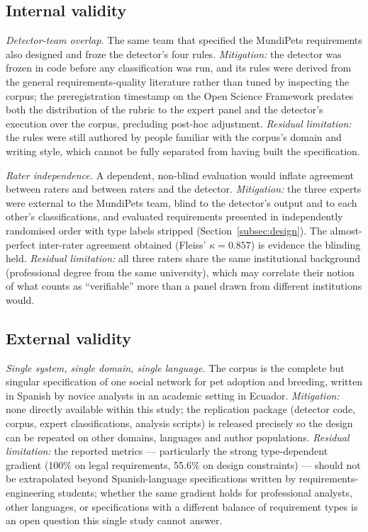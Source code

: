 \documentclass[pdflatex,sn-mathphys-num]{sn-jnl}
\theoremstyle{thmstyleone}%
\theoremstyle{thmstyletwo}%
\theoremstyle{thmstylethree}%
\begin{document}
	\subsection{Internal validity}\label{subsec:threats-internal}
	
	\emph{Detector-team overlap.} The same team that specified the MundiPets
	requirements also designed and froze the detector's four rules.
	\emph{Mitigation:} the detector was frozen in code before any classification
	was run, and its rules were derived from the general requirements-quality
	literature rather than tuned by inspecting the corpus; the preregistration
	timestamp on the Open Science Framework predates both the distribution of the
	rubric to the expert panel and the detector's execution over the corpus,
	precluding post-hoc adjustment. \emph{Residual limitation:} the rules were
	still authored by people familiar with the corpus's domain and writing style,
	which cannot be fully separated from having built the specification.
	
	\emph{Rater independence.} A dependent, non-blind evaluation would inflate
	agreement between raters and between raters and the detector.
	\emph{Mitigation:} the three experts were external to the MundiPets team, blind
	to the detector's output and to each other's classifications, and evaluated
	requirements presented in independently randomised order with type labels
	stripped (Section~\ref{subsec:design}). The almost-perfect inter-rater
	agreement obtained (Fleiss' $\kappa=0.857$) is evidence the blinding held.
	\emph{Residual limitation:} all three raters share the same institutional
	background (professional degree from the same university), which may correlate
	their notion of what counts as ``verifiable'' more than a panel drawn from
	different institutions would.
	
	\subsection{External validity}\label{subsec:threats-external}
	
	\emph{Single system, single domain, single language.} The corpus is the
	complete but singular specification of one social network for pet adoption and
	breeding, written in Spanish by novice analysts in an academic setting in
	Ecuador. \emph{Mitigation:} none directly available within this study; the
	replication package (detector code, corpus, expert classifications, analysis
	scripts) is released precisely so the design can be repeated on other domains,
	languages and author populations. \emph{Residual limitation:} the reported
	metrics --- particularly the strong type-dependent gradient (100\% on legal
	requirements, 55.6\% on design constraints) --- should not be extrapolated
	beyond Spanish-language specifications written by requirements-engineering
	students; whether the same gradient holds for professional analysts, other
	languages, or specifications with a different balance of requirement types is
	an open question this single study cannot answer.
	
\end{document}
